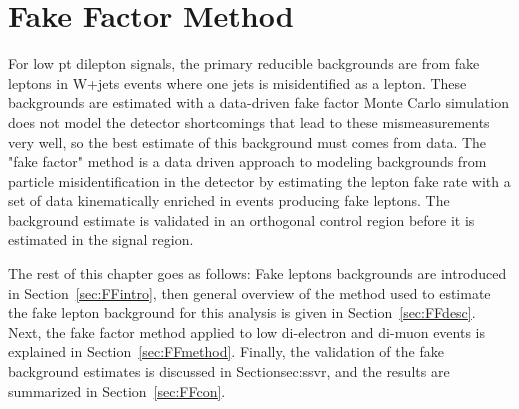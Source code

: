 \chapter{Fake Factor Method}
\label{ch:fakefactor}
 For low pt dilepton signals, the primary reducible backgrounds are from fake leptons in W+jets events where one jets is misidentified as a lepton.  These backgrounds are estimated with a data-driven fake factor Monte Carlo simulation does not model the detector shortcomings that lead to these mismeasurements very well, so the best estimate of this background must comes from data.  The "fake factor" method is a data driven approach to modeling backgrounds from particle misidentification in the detector by estimating the lepton fake rate with a set of data kinematically enriched in events producing fake leptons.  The background estimate is validated in an orthogonal control region before it is estimated in the signal region. 

The rest of this chapter goes as follows:  Fake leptons backgrounds are introduced in Section~\ref{sec:FFintro}, then general overview of the method used to estimate the fake lepton background for this analysis is given in Section~\ref{sec:FFdesc}.  Next, the fake factor method applied to low \pt{} di-electron and di-muon events is explained in Section~\ref{sec:FFmethod}.  Finally, the validation of the fake background estimates is discussed in Section{sec:ssvr}, and the results are summarized in Section~\ref{sec:FFcon}.

